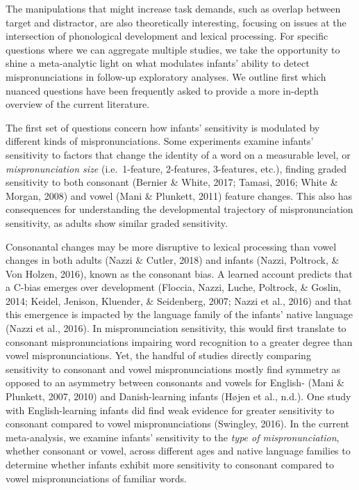 \documentclass[man]{apa6}
\begin{document}
The manipulations that might increase task demands, such as overlap between target and distractor, are also theoretically interesting, focusing on issues at the intersection of phonological development and lexical processing. For specific questions where we can aggregate multiple studies, we take the opportunity to shine a meta-analytic light on what modulates infants' ability to detect mispronunciations in follow-up exploratory analyses. We outline first which nuanced questions have been frequently asked to provide a more in-depth overview of the current literature.

The first set of questions concern how infants' sensitivity is modulated by different kinds of mispronunciations. Some experiments examine infants' sensitivity to factors that change the identity of a word on a measurable level, or \emph{mispronunciation size} (i.e.~1-feature, 2-features, 3-features, etc.), finding graded sensitivity to both consonant (Bernier \& White, 2017; Tamasi, 2016; White \& Morgan, 2008) and vowel (Mani \& Plunkett, 2011) feature changes. This also has consequences for understanding the developmental trajectory of mispronunciation sensitivity, as adults show similar graded sensitivity.

Consonantal changes may be more disruptive to lexical processing than vowel changes in both adults (Nazzi \& Cutler, 2018) and infants (Nazzi, Poltrock, \& Von Holzen, 2016), known as the consonant bias. A learned account predicts that a C-bias emerges over development (Floccia, Nazzi, Luche, Poltrock, \& Goslin, 2014; Keidel, Jenison, Kluender, \& Seidenberg, 2007; Nazzi et al., 2016) and that this emergence is impacted by the language family of the infants' native language (Nazzi et al., 2016). In mispronunciation sensitivity, this would first translate to consonant mispronunciations impairing word recognition to a greater degree than vowel mispronunciations. Yet, the handful of studies directly comparing sensitivity to consonant and vowel mispronunciations mostly find symmetry as opposed to an asymmetry between consonants and vowels for English- (Mani \& Plunkett, 2007, 2010) and Danish-learning infants (Højen et al., n.d.). One study with English-learning infants did find weak evidence for greater sensitivity to consonant compared to vowel mispronunciations (Swingley, 2016). In the current meta-analysis, we examine infants' sensitivity to the \emph{type of mispronunciation}, whether consonant or vowel, across different ages and native language families to determine whether infants exhibit more sensitivity to consonant compared to vowel mispronunciations of familiar words.
\end{document}
